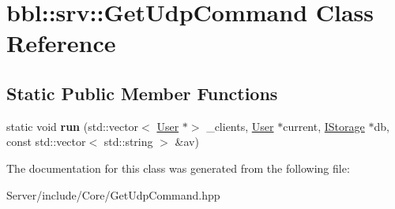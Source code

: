 \hypertarget{classbbl_1_1srv_1_1_get_udp_command}{}\section{bbl\+:\+:srv\+:\+:Get\+Udp\+Command Class Reference}
\label{classbbl_1_1srv_1_1_get_udp_command}
\subsection*{Static Public Member Functions}
\begin{DoxyCompactItemize}
\item 
\mbox{\label{classbbl_1_1srv_1_1_get_udp_command_a155256d66ff3fc904e6be9de63a70e98}} 
static void {\bfseries run} (std\+::vector$<$ \hyperlink{classbbl_1_1srv_1_1_user}{User} $\ast$$>$ \+\_\+clients, \hyperlink{classbbl_1_1srv_1_1_user}{User} $\ast$current, \hyperlink{classbbl_1_1srv_1_1_i_storage}{I\+Storage} $\ast$db, const std\+::vector$<$ std\+::string $>$ \&av)
\end{DoxyCompactItemize}


The documentation for this class was generated from the following file\+:\begin{DoxyCompactItemize}
\item 
Server/include/\+Core/Get\+Udp\+Command.\+hpp\end{DoxyCompactItemize}
